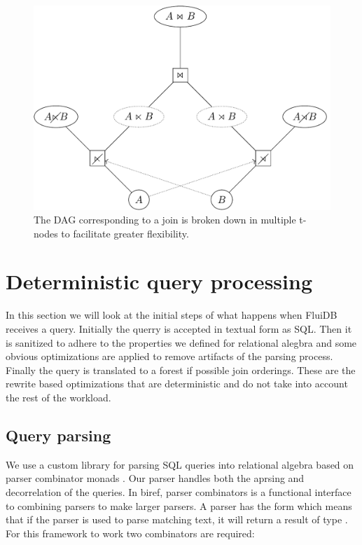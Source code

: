 \begin{figure}[H]
  \centering
  \includegraphics[width=.9\linewidth]{./imgs/joinnetdir.pdf}
  \caption{\label{fig:joinnetdir}The DAG corresponding to a join is
    broken down in multiple t-nodes to facilitate greater
    flexibility.}
\end{figure}

\section{Deterministic query processing}
\label{sec:query_processing}

In this section we will look at the initial steps of what happens when
FluiDB receives a query. Initially the querry is accepted in textual
form as SQL. Then it is sanitized to adhere to the properties we
defined for relational alegbra and some obvious optimizations are
applied to remove artifacts of the parsing process. Finally the query
is translated to a forest if possible join orderings. These are the
rewrite based optimizations that are deterministic and do not take
into account the rest of the workload.

\subsection{Query parsing}
\label{sec:query_parsing}

We use a custom library for parsing SQL queries into relational
algebra based on parser combinator monads
\cite{leijenParsecDirectStyle}. Our parser handles both the aprsing
and decorrelation of the queries. In biref, parser combinators is a
functional interface to combining parsers to make larger parsers. A
parser  has the form  which means that if the parser
is used to parse matching text, it will return a result of type
. For this framework to work two combinators are required:

